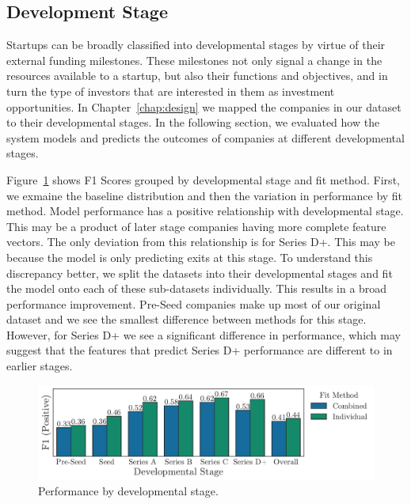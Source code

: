 \documentclass[../thesis/thesis.tex]{subfiles}
\begin{document}
\subsection{Development Stage}

Startups can be broadly classified into developmental stages by virtue of their external funding milestones. These milestones not only signal a change in the resources available to a startup, but also their functions and objectives, and in turn the type of investors that are interested in them as investment opportunities. In Chapter~\ref{chap:design} we mapped the companies in our dataset to their developmental stages. In the following section, we evaluated how the system models and predicts the outcomes of companies at different developmental stages.

Figure~\ref{fig:evaluation:performance_stage} shows F1 Scores grouped by developmental stage and fit method. First, we exmaine the baseline distribution and then the variation in performance by fit method. Model performance has a positive relationship with developmental stage. This may be a product of later stage companies having more complete feature vectors. The only deviation from this relationship is for Series D+. This may be because the model is only predicting exits at this stage. To understand this discrepancy better, we split the datasets into their developmental stages and fit the model onto each of these sub-datasets individually. This results in a broad performance improvement. Pre-Seed companies make up most of our original dataset and we see the smallest difference between methods for this stage. However, for Series D+ we see a significant difference in performance, which may suggest that the features that predict Series D+ performance are different to in earlier stages.

\begin{figure}[!htb]
    \centering
    \includegraphics[width=\textwidth]{../figures/evaluation/performance_stage}
    \caption[Performance by developmental stage]{Performance by developmental stage.}
    \label{fig:evaluation:performance_stage}
\end{figure}
\end{document}
